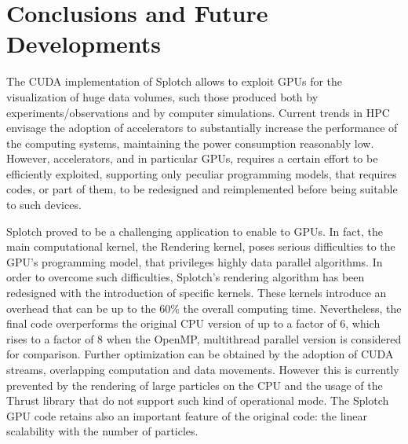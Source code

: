 \documentclass[1p]{elsarticle}
\begin{document}

\section{Conclusions and Future Developments}
\label{sec:conclusions}
The CUDA implementation of Splotch allows to exploit GPUs 
for the visualization of huge data volumes, such those produced both 
by experiments/observations and by computer simulations. Current trends
in HPC envisage the adoption of accelerators to substantially 
increase the performance of the computing systems, maintaining the power
consumption reasonably low. However, accelerators, and in particular 
GPUs, requires a certain effort to be efficiently exploited, 
supporting only peculiar programming models, that requires codes, or part
of them, to be redesigned and reimplemented before being suitable to such devices. 

Splotch proved to be a challenging application to enable to GPUs. 
In fact, the main computational kernel, the Rendering kernel, poses serious difficulties
to the GPU's programming model, that privileges highly data parallel algorithms.
In order to overcome such difficulties, Splotch's rendering algorithm has been
redesigned with the introduction of specific kernels. These kernels 
introduce an overhead that can be up to the 60\% the overall computing
time. Nevertheless, the final code overperforms the original CPU
version of up to a factor of 6, which rises to a factor of 8 when the OpenMP,
multithread parallel version is considered for comparison. Further optimization can
be obtained by the adoption of CUDA streams, overlapping computation 
and data movements. However this is currently prevented by the rendering of large particles on the CPU and the usage of the Thrust library that do not support such kind of operational mode. 
The Splotch GPU code retains also an important feature of the original
code: the linear scalability with the number of particles.
\end{document}
